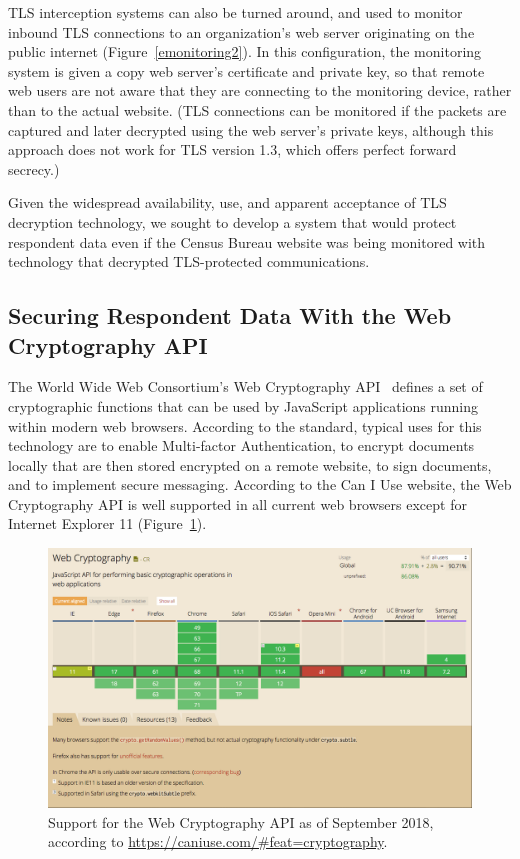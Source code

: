 \documentclass[fleqn,12pt]{wlscirep}
\begin{document}
TLS interception systems can also be turned around, and used to
monitor inbound TLS connections to an organization's web server
originating on the public internet
(Figure~\ref{emonitoring2}). In this configuration, the monitoring
system is given a copy web server's certificate and private key, so
that remote web users are not aware that they are connecting to the
monitoring device, rather than to the actual website. (TLS connections can be
monitored if the packets are captured and later decrypted using
the web server's private keys, although this approach does not work
for TLS version 1.3, which offers perfect forward secrecy.)

Given the widespread availability, use, and apparent acceptance of TLS
decryption technology, we sought to develop a system that would
protect respondent data even if the Census Bureau website was being
monitored with technology that decrypted TLS-protected communications. 
 
\subsection{Securing Respondent Data With the Web Cryptography API}

The World Wide Web Consortium's Web Cryptography API~\cite{wcapi}
defines a set of cryptographic functions that can be used by
JavaScript applications running within modern web browsers. According to the
standard, typical uses for this technology are to enable Multi-factor
Authentication, to encrypt documents locally that are then stored
encrypted on a remote website, to sign documents, and to implement
secure messaging. According to the Can I Use website, the Web
Cryptography API is well supported in all current web browsers except
for Internet Explorer 11 (Figure~\ref{caniuse}).

\begin{figure}
  \includegraphics[width=\linewidth]{art/caniuse}
  \caption{Support for the Web Cryptography API as of September 2018,
    according to \url{https://caniuse.com/\#feat=cryptography}.\label{caniuse}}
\end{figure}
\end{document}
